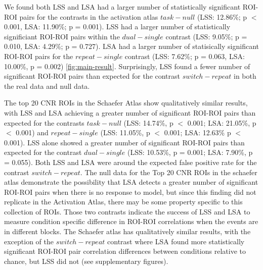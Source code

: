 \documentclass[10pt,letterpaper]{article}
\begin{document}
We found both LSS and LSA had a larger number of statistically significant ROI-ROI pairs
for the contrasts in the activation atlas $task - null$ (LSS: 12.86\%; p $<$ 0.001, LSA: 11.90\%; p = 0.001).
LSS had a larger number of statistically significiant ROI-ROI pairs within the 
$dual - single$ contrast (LSS: 9.05\%; p = 0.010, LSA: 4.29\%; p = 0.727).
LSA had a larger number of statisically significant ROI-ROI pairs for the
$repeat - single$ contrast (LSS: 7.62\%; p = 0.063, LSA: 10.00\%, p = 0.002) \ref{fig:main-result}.
Surprisingly, LSS found a fewer number of significant ROI-ROI pairs than expected
for the contrast $switch - repeat$ in both the real data and null data. 

The top 20 CNR ROIs in the Schaefer Atlas show qualitatively similar results,
with LSS and LSA achieving a greater number of significant ROI-ROI pairs
than expected for the contrasts
$task - null$ (LSS: 14.74\%, p $<$ 0.001; LSA: 21.05\%, p $<$ 0.001) and
$repeat - single$ (LSS: 11.05\%, p $<$ 0.001; LSA: 12.63\% p $<$ 0.001).
LSS alone showed a greater number of significant ROI-ROI pairs than expected
for the contrast
$dual - single$ (LSS: 10.53\%, p = 0.001; LSA: 7.90\%, p = 0.055).
Both LSS and LSA were around the expected false positive rate for the contrast
$switch - repeat$.
The null data for the Top 20 CNR ROIs in the schaefer atlas demonstrate
the possibility that LSA detects a greater number of significant ROI-ROI
pairs when there is no response to model, but since this finding did not
replicate in the Activation Atlas, there may be some property specific
to this collection of ROIs.
Those two contrasts indicate the success of LSS and LSA to measure
condition specific difference in ROI-ROI correlations when the events are in different blocks.
The Schaefer atlas has qualitatively similar results, with the exception of
the $switch - repeat$ contrast where LSA found more statistically significant
ROI-ROI pair correlation differences between conditions relative to chance,
but LSS did not (see supplementary figures).
\end{document}
